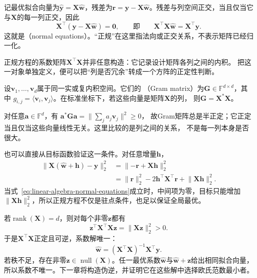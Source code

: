 记最优拟合向量为$\widehat{\bm{y}}=\bm{X}\widehat{\bm{w}}$，残差为$\bm{r}=\bm{y}-\bm{X}\widehat{\bm{w}}$。残差与列空间正交，当且仅当它与$\bm{X}$的每一列正交，因此
\begin{equation}
  \bm{X}^{\top} (\bm{y}-\bm{X}\widehat{\bm{w}}) = \bm{0}, \qquad\text{即}\qquad \bm{X}^{\top}\bm{X}\widehat{\bm{w}} = \bm{X}^{\top}\bm{y}. \label{eq:linear-algebra-normal-equations}
\end{equation}
这就是（normal equations）。“正规”在这里指法向或正交关系，不表示矩阵已经归一化。

正规方程的系数矩阵$\bm X^{\top}\bm X$并非任意构造：它记录设计矩阵各列之间的内积。
把这一对象单独定义，便可以把“列是否冗余”转成一个方阵的正定性判断。
\begin{definition}[有限向量族的Gram矩阵]
\label{def:linear-algebra-gram-matrix}
设$\bm v_1,\ldots,\bm v_d$属于同一实或复内积空间。它们的
（Gram matrix）为$\bm G\in\mathbb F^{d\times d}$，其中
$g_{i,j}=\langle\bm v_i,\bm v_j\rangle$。在标准坐标下，若这些向量是矩阵$\bm X$的列，
则$\bm G=\bm X^*\bm X$。
\end{definition}
对任意$\bm a\in\mathbb F^d$，有
$\bm a^*\bm G\bm a=\lVert\sum_j a_j\bm v_j\rVert^2\geq0$，
故Gram矩阵总是半正定；它正定当且仅当这些向量线性无关。这里比较的是列之间的关系，
不是每一列本身是否很大。

也可以直接从目标函数验证这一条件。对任意增量$\bm{h}$，
\begin{align*}
  \lVert\bm{X}(\widehat{\bm{w}}+\bm{h})-\bm{y}\rVert_2^2
  &=
  \lVert-\bm{r}+\bm{X}\bm{h}\rVert_2^2\\
  &=
  \lVert\bm{r}\rVert_2^2
  -2\bm{h}^{\top}\bm{X}^{\top}\bm{r}
  +\lVert\bm{X}\bm{h}\rVert_2^2.
\end{align*}
当式~\eqref{eq:linear-algebra-normal-equations}成立时，中间项为零，目标只能增加$\lVert\bm{X}\bm{h}\rVert_2^2$，所以正规方程不仅是驻点条件，也足以保证全局最优。

若$\operatorname{rank}(\bm{X})=d$，则对每个非零$\bm{z}$都有
\[
  \bm{z}^{\top}\bm{X}^{\top}\bm{X}\bm{z}
  =
  \lVert\bm{X}\bm{z}\rVert_2^2
  >0.
\]
于是$\bm{X}^{\top}\bm{X}$正定且可逆，系数解唯一：
\begin{equation}
  \widehat{\bm{w}} = (\bm{X}^{\top}\bm{X})^{-1}\bm{X}^{\top}\bm{y}. \label{eq:linear-algebra-full-rank-least-squares}
\end{equation}
若秩不足，存在非零$\bm{z}\in\operatorname{null}(\bm{X})$。任一最优系数$\widehat{\bm{w}}$与$\widehat{\bm{w}}+\bm{z}$给出相同拟合向量，所以系数不唯一。下一章将构造伪逆，并证明它在这些解中选择欧氏范数最小者。

